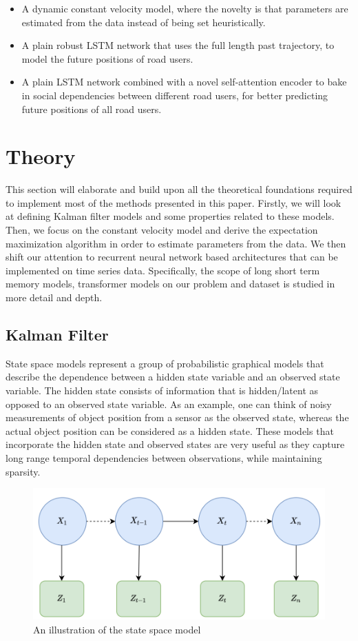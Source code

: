 \documentclass{article}
\begin{document}
\begin{itemize}
    \item A dynamic constant velocity model, where the novelty is that parameters are estimated from the data instead of being set heuristically. 
    \item A plain robust LSTM network that uses the full length past trajectory, to model the future positions of road users.
    \item A plain LSTM network combined with a novel self-attention encoder to bake in social dependencies between different road users, for better predicting future positions of all road users. 
\end{itemize}


\section{Theory}
This section will elaborate and build upon all the theoretical foundations required to implement most of the methods presented in this paper. Firstly, we will look at defining Kalman filter models and some properties related to these models. Then, we focus on the constant velocity model and derive the expectation maximization algorithm in order to estimate parameters from the data. We then shift our attention to recurrent neural network based architectures that can be implemented on time series data. Specifically, the scope of long short term memory models, transformer models on our problem and dataset is studied in more detail and depth. 

\subsection{Kalman Filter}\label{ssec:kf_theory}

State space models represent a group of probabilistic graphical models that describe the dependence between a hidden state variable and an observed state variable. The hidden state consists of information that is hidden/latent as opposed to an observed state variable. As an example, one can think of noisy measurements of object position from a sensor as the observed state, whereas the actual object position can be considered as a hidden state. These models that incorporate the hidden state and observed states are very useful as they capture long range temporal dependencies between observations, while maintaining sparsity.

\begin{figure}[H]
\centering
\includegraphics[scale=0.4]{theory/hmm.png}
\caption{An illustration of the state space model}
\label{fig:hmm}
\end{figure}
\end{document}
